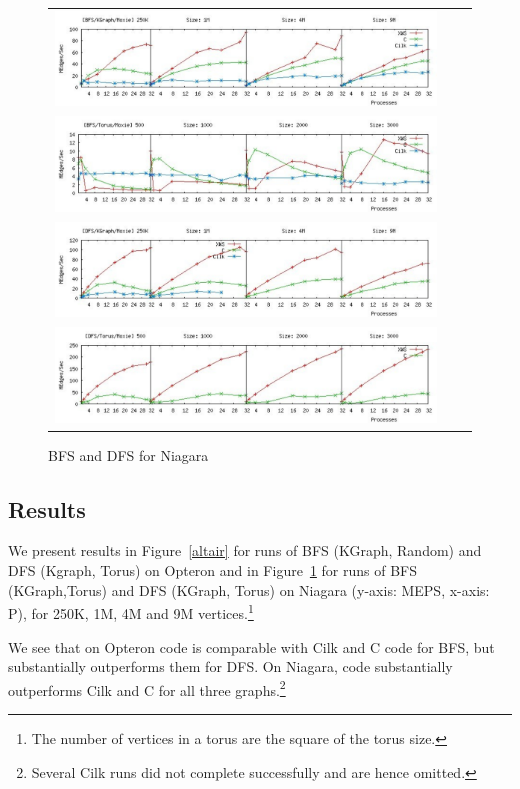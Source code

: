 \begin{figure}
 \begin{tabular}{ccc}
\includegraphics[width=14cm]{../plots/bfs-kgraph-moxie-color.pdf} \\
\includegraphics[width=14cm]{../plots/bfs-torus-moxie-color.pdf} \\
\includegraphics[width=14cm]{../plots/dfs-kgraph-moxie-color.pdf}\\
\includegraphics[width=14cm]{../plots/dfs-torus-moxie-color.pdf}\\

 \end{tabular}
\caption{BFS and DFS for Niagara}\label{moxie}
\end{figure}
\twocolumn
\subsection{Results}
We present results in Figure~\ref{altair} for runs of BFS (KGraph,
Random) and DFS (Kgraph, Torus) on Opteron and in Figure~\ref{moxie}
for runs of BFS (KGraph,Torus) and DFS (KGraph, Torus) on Niagara
(y-axis: MEPS, x-axis: P), for 250K, 1M, 4M and 9M vertices.\footnote{
The number of vertices in a torus are the square of the torus
size.}

We see that on Opteron \XWS{} code is comparable with Cilk and C code
for BFS, but substantially outperforms them for DFS. On Niagara,
\XWS{} code substantially outperforms Cilk and C for all three
graphs.\footnote{Several Cilk runs did not complete successfully and
are hence omitted.}

